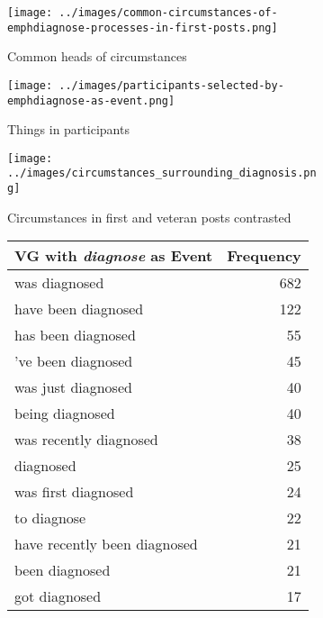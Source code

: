     \begin{landscape}
    \raggedright
    \begin{figure}
    \centering %
    \begin{subfigure}{.64\textwidth}
    \texttt{[image: ../images/common-circumstances-of-emphdiagnose-processes-in-first-posts.png]}
    \caption{Common heads of circumstances} \label{fig:a}
    \end{subfigure}
    \begin{subfigure}{.64\textwidth}
    \texttt{[image: ../images/participants-selected-by-emphdiagnose-as-event.png]}
    \caption{Things in participants} \label{fig:b}
    \end{subfigure}
    \begin{subfigure}{.64\textwidth}
    \texttt{[image: ../images/circumstances\_surrounding\_diagnosis.png]}
    \caption{Circumstances in first and veteran posts contrasted} \label{fig:f}
    \end{subfigure}
    \begin{subfigure}{.64\textwidth}
    \singlespacing \footnotesize
    \begin{tabular}{lr}
    \toprule
    VG with \emph{diagnose} as Event &  Frequency \\
    \midrule
    was diagnosed                &    682 \\
    have been diagnosed          &    122 \\
    has been diagnosed           &     55 \\
    've been diagnosed           &     45 \\
    was just diagnosed           &     40 \\
    being diagnosed              &     40 \\
    was recently diagnosed       &     38 \\
    diagnosed                    &     25 \\
    was first diagnosed          &     24 \\
    to diagnose                  &     22 \\
    have recently been diagnosed &     21 \\
    been diagnosed               &     21 \\
    got diagnosed                &     17 \\

\end{tabular}
\end{subfigure}
\end{figure}
\end{landscape}
